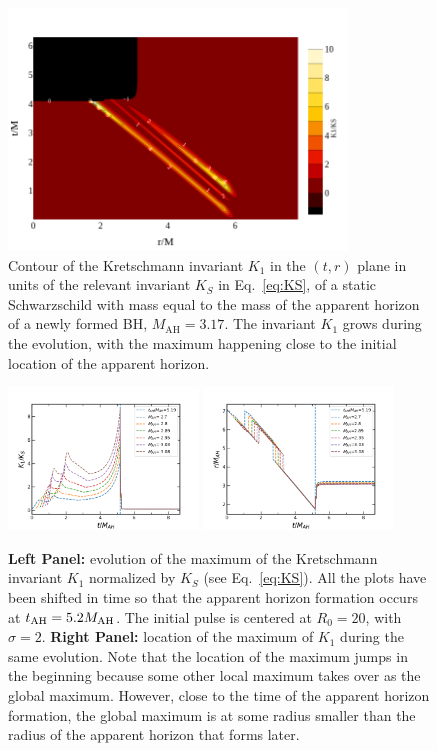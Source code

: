 \documentclass[floats,floatfix,showpacs,amssymb,prd,twocolumn,superscriptaddress,nofootinbib,nolongbibliography,reprint]{revtex4-2}
\begin{document}
 \begin{figure}[!t]
    \centering
    \includegraphics[width=9cm]{scalarcollapse/R0=20, s=2, varying P/ContourKO4.png}
    \caption{Contour of the Kretschmann invariant $K_1$ in the $(t,r)$ plane in units of the relevant invariant $K_S$ in Eq.~\eqref{eq:KS}, of a static Schwarzschild with mass equal to the mass of the apparent horizon of a newly formed BH, $M_{\text{AH}}=3.17$. The invariant $K_1$ grows during the evolution, with the maximum happening close to the initial location of the apparent horizon.}
    \label{fig:figure_1}
\end{figure}
%
%
 \begin{figure}[!t]
    \centering
    \includegraphics[width=0.45\textwidth]{scalarcollapse/R0=20, s=2, varying P/KmaxoutallO4.png}
    \includegraphics[width=0.45\textwidth]{scalarcollapse/R0=20, s=2, varying P/locKmaxoutallO4.png}
    \caption{{\bf Left Panel:} evolution of the maximum of the Kretschmann invariant $K_1$ normalized by $K_S$ (see Eq.~\eqref{eq:KS}). All the plots have been shifted in time so that the apparent horizon formation occurs at $t_{\rm AH}=5.2M_{\rm AH}$. The initial pulse is centered at $R_0=20$, with $\sigma=2$. {\bf Right Panel:} location of the maximum of $K_1$ during the same evolution. Note that the location of the maximum jumps in the beginning because some other local maximum takes over as the global maximum. However, close to the time of the apparent horizon formation, the global maximum is at some radius smaller than the radius of the apparent horizon that forms later.}
    \label{fig:figure_2}
\end{figure}
 
\end{document}
